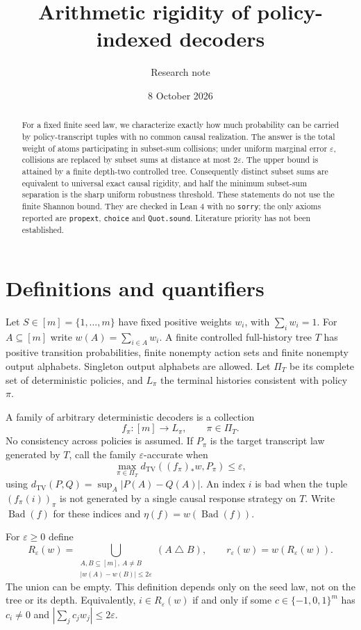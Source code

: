 \documentclass[11pt]{article}
\title{Arithmetic rigidity of policy-indexed decoders}
\author{Research note}
\date{8 October 2026}
\newcommand{\TV}{d_{\mathrm{TV}}}
\begin{document}
\maketitle
\begin{abstract}
For a fixed finite seed law, we characterize exactly how much probability can be carried by policy-transcript tuples with no common causal realization. The answer is the total weight of atoms participating in subset-sum collisions; under uniform marginal error $\varepsilon$, collisions are replaced by subset sums at distance at most $2\varepsilon$. The upper bound is attained by a finite depth-two controlled tree. Consequently distinct subset sums are equivalent to universal exact causal rigidity, and half the minimum subset-sum separation is the sharp uniform robustness threshold. These statements do not use the finite Shannon bound. They are checked in Lean 4 with no \texttt{sorry}; the only axioms reported are \texttt{propext}, \texttt{choice} and \texttt{Quot.sound}. Literature priority has not been established.
\end{abstract}

\section{Definitions and quantifiers}
Let $S\in[m]=\{1,\ldots,m\}$ have fixed positive weights $w_i$, with $\sum_iw_i=1$. For $A\subseteq[m]$ write $w(A)=\sum_{i\in A}w_i$. A finite controlled full-history tree $T$ has positive transition probabilities, finite nonempty action sets and finite nonempty output alphabets. Singleton output alphabets are allowed. Let $\Pi_T$ be its complete set of deterministic policies, and $L_\pi$ the terminal histories consistent with policy $\pi$.

A family of arbitrary deterministic decoders is a collection
\[
 f_\pi:[m]\longrightarrow L_\pi,\qquad\pi\in\Pi_T.
\]
No consistency across policies is assumed. If $P_\pi$ is the target transcript law generated by $T$, call the family $\varepsilon$-accurate when
\[
 \max_{\pi\in\Pi_T}\TV((f_\pi)_*w,P_\pi)\le\varepsilon,
\]
using $\TV(P,Q)=\sup_A|P(A)-Q(A)|$. An index $i$ is bad when the tuple $(f_\pi(i))_\pi$ is not generated by a single causal response strategy on $T$. Write $\operatorname{Bad}(f)$ for these indices and $\eta(f)=w(\operatorname{Bad}(f))$.

For $\varepsilon\ge0$ define
\[
 R_\varepsilon(w)=
 \bigcup_{\substack{A,B\subseteq[m],\ A\ne B\\|w(A)-w(B)|\le2\varepsilon}}(A\mathbin\triangle B),
 \qquad r_\varepsilon(w)=w(R_\varepsilon(w)).
\]
The union can be empty. This definition depends only on the seed law, not on the tree or its depth. Equivalently, $i\in R_\varepsilon(w)$ if and only if some $c\in\{-1,0,1\}^m$ has $c_i\ne0$ and $|\sum_jc_jw_j|\le2\varepsilon$.
\end{document}
